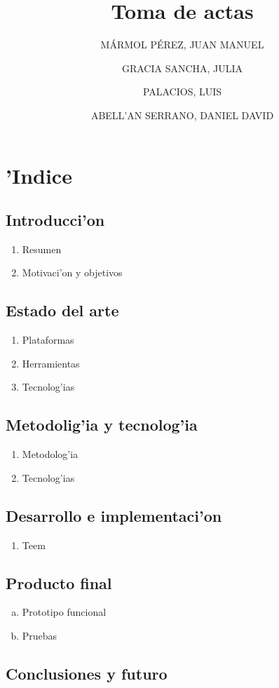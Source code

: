 \documentclass{article}
\title{Toma de actas}
\author{ 
	MÁRMOL PÉREZ, JUAN MANUEL \\
	\and
	GRACIA SANCHA, JULIA \\
	\and
	PALACIOS, LUIS \\
	\and
	ABELL'AN SERRANO, DANIEL DAVID \\
}
\begin{document}
\maketitle
\newpage
\section*{'Indice}
	\subsection{Introducci'on}
		\begin{enumerate}
			\item Resumen
			\item Motivaci'on y objetivos
		\end{enumerate}
	\subsection{Estado del arte}
		\begin{enumerate}
			\item Plataformas
			\item Herramientas
			\item Tecnolog'ias
		\end{enumerate}
	\subsection{Metodolig'ia y tecnolog'ia}
		\begin{enumerate}
			\item Metodolog'ia
			\item Tecnolog'ias
		\end{enumerate}	
	\subsection{Desarrollo e implementaci'on}
		\begin{enumerate}
			\item Teem
		\end{enumerate}	
	\subsection{Producto final}
		\begin{enumerate}[a)]
			\item Prototipo funcional
			\item Pruebas
		\end{enumerate}	
	\subsection{Conclusiones y futuro}
\end{document}
